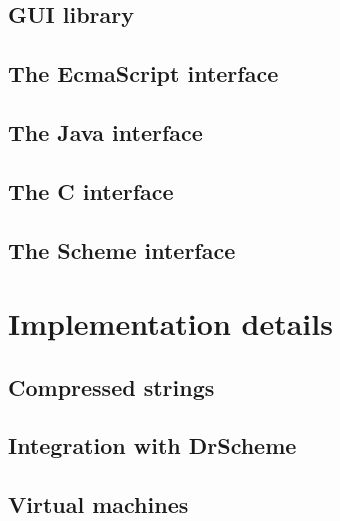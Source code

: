 \documentclass[12pt]{report}
\begin{document}
\chapter{GUI library}
\chapter{The EcmaScript interface}
\chapter{The Java interface}
\chapter{The C interface}
\chapter{The Scheme interface}

\part{Implementation details}
\chapter{Compressed strings}
\chapter{Integration with DrScheme}
\chapter{Virtual machines}

\newpage
{}



\appendix

\newpage
{}
\printindex
\end{document}
